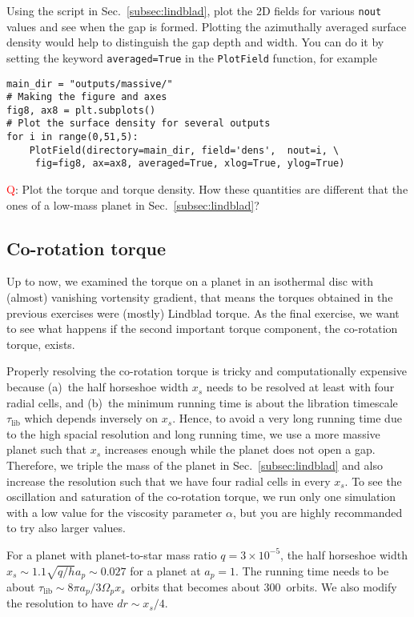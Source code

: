 \documentclass[14pt]{scrartcl}
\begin{document}
Using the script in Sec.~\ref{subsec:lindblad}, plot the 2D fields for various \texttt{nout} values and see when the gap is formed. Plotting the azimuthally averaged surface density would help to distinguish the gap depth and width. You can do it by setting the keyword \texttt{averaged=True} in the \texttt{PlotField} function, for example

\begin{verbatim}
main_dir = "outputs/massive/"
# Making the figure and axes
fig8, ax8 = plt.subplots()
# Plot the surface density for several outputs
for i in range(0,51,5):    
    PlotField(directory=main_dir, field='dens',  nout=i, \
     fig=fig8, ax=ax8, averaged=True, xlog=True, ylog=True)
\end{verbatim}

\textcolor{red}{Q}: Plot the torque and torque density. How these quantities are different that the ones of a low-mass planet in Sec.~\ref{subsec:lindblad}?

\subsection{Co-rotation torque} \label{subsec:corotation}	
Up to now, we examined the torque on a planet in an isothermal disc with (almost) vanishing vortensity gradient, that means the torques obtained in the previous exercises were (mostly) Lindblad torque. As the final exercise, we want to see what happens if the second important torque component, the co-rotation torque, exists. 

Properly resolving the co-rotation torque is tricky and computationally expensive because (a)~the half horseshoe width $x_s$ needs to be resolved at least with four radial cells, and (b)~the minimum running time is about the libration timescale $\tau_{\mathrm{lib}}$ which depends inversely on $x_s$. Hence, to avoid a very long running time due to the high spacial resolution and long running time, we use a more massive planet such that $x_s$ increases enough while the planet does not open a gap. Therefore, we triple the mass of the planet in Sec.~\ref{subsec:lindblad} and also increase the resolution such that we have four radial cells in every $x_s$. To see the oscillation and saturation of the co-rotation torque, we run only one simulation with a low value for the viscosity parameter $\alpha$, but you are highly recommanded to try also larger values.

For a planet with planet-to-star mass ratio $q=3 \times 10^{-5}$, the half horseshoe width $x_s \sim 1.1 \sqrt{q/h} a_p \sim 0.027$ for a planet at $a_p=1$. The running time needs to be about $\tau_{\mathrm{lib}} \sim 8 \pi a_p/3 \Omega_p x_s  $~orbits that becomes about 300~orbits. We also modify the resolution to have $dr \sim x_s/4$.
\end{document}
